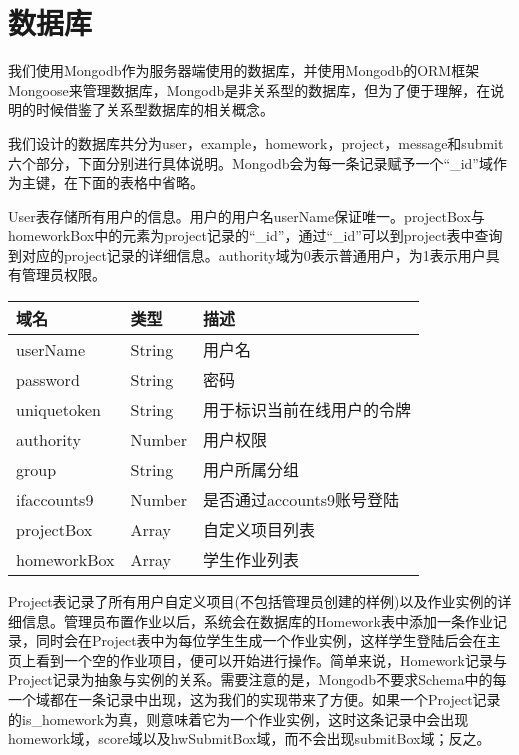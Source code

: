 \section{数据库}
我们使用Mongodb作为服务器端使用的数据库，并使用Mongodb的ORM框架Mongoose来管理数据库，Mongodb是非关系型的数据库，但为了便于理解，在说明的时候借鉴了关系型数据库的相关概念。

我们设计的数据库共分为user，example，homework，project，message和submit六个部分，下面分别进行具体说明。Mongodb会为每一条记录赋予一个“\_id”域作为主键，在下面的表格中省略。


User表存储所有用户的信息。用户的用户名userName保证唯一。projectBox与homeworkBox中的元素为project记录的“\_id”，通过“\_id”可以到project表中查询到对应的project记录的详细信息。authority域为0表示普通用户，为1表示用户具有管理员权限。
\begin{center}
	\begin{longtable}{p{}p{}p{}}
		\toprule
		 域名 & 类型 & 描述 \\
		 \midrule
		 userName & String & 用户名 \\
		 password & String & 密码 \\
		 uniquetoken & String & 用于标识当前在线用户的令牌 \\
		 authority & Number & 用户权限 \\
		 group & String & 用户所属分组 \\
		 ifaccounts9 & Number & 是否通过accounts9账号登陆 \\
		 projectBox & Array & 自定义项目列表 \\
		 homeworkBox & Array & 学生作业列表 \\
		 \bottomrule
	\end{longtable}
\end{center}


Project表记录了所有用户自定义项目(不包括管理员创建的样例)以及作业实例的详细信息。管理员布置作业以后，系统会在数据库的Homework表中添加一条作业记录，同时会在Project表中为每位学生生成一个作业实例，这样学生登陆后会在主页上看到一个空的作业项目，便可以开始进行操作。简单来说，Homework记录与Project记录为抽象与实例的关系。需要注意的是，Mongodb不要求Schema中的每一个域都在一条记录中出现，这为我们的实现带来了方便。如果一个Project记录的is\_homework为真，则意味着它为一个作业实例，这时这条记录中会出现homework域，score域以及hwSubmitBox域，而不会出现submitBox域；反之。

